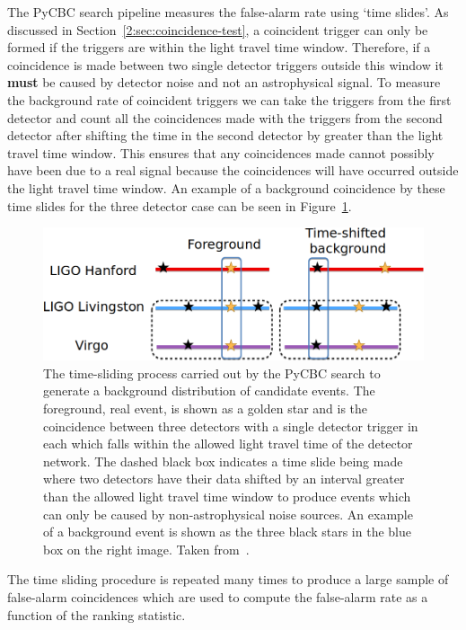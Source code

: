 The PyCBC search pipeline measures the false-alarm rate using `time slides'. As discussed in Section~\ref{2:sec:coincidence-test}, a coincident trigger can only be formed if the triggers are within the light travel time window. Therefore, if a coincidence is made between two single detector triggers outside this window it \textbf{must} be caused by detector noise and not an astrophysical signal. To measure the background rate of coincident triggers we can take the triggers from the first detector and count all the coincidences made with the triggers from the second detector after shifting the time in the second detector by greater than the light travel time window. This ensures that any coincidences made cannot possibly have been due to a real signal because the coincidences will have occurred outside the light travel time window. An example of a background coincidence by these time slides for the three detector case can be seen in Figure~\ref{2:fig:timeslides}.
%
\begin{figure}
    \centering
    \includegraphics[width=0.9\linewidth]{images/2_searches/TimeslideExample.png}
    \caption{The time-sliding process carried out by the PyCBC search to generate a background distribution of candidate events. The foreground, real \gwadj event, is shown as a golden star and is the coincidence between three detectors with a single detector trigger in each which falls within the allowed light travel time of the detector network. The dashed black box indicates a time slide being made where two detectors have their data shifted by an interval greater than the allowed light travel time window to produce events which can only be caused by non-astrophysical noise sources. An example of a background event is shown as the three black stars in the blue box on the right image. Taken from~\cite{PyCBC_global:2020}.}
    \label{2:fig:timeslides}
\end{figure}
%

The time sliding procedure is repeated many times to produce a large sample of false-alarm coincidences which are used to compute the false-alarm rate as a function of the ranking statistic.


